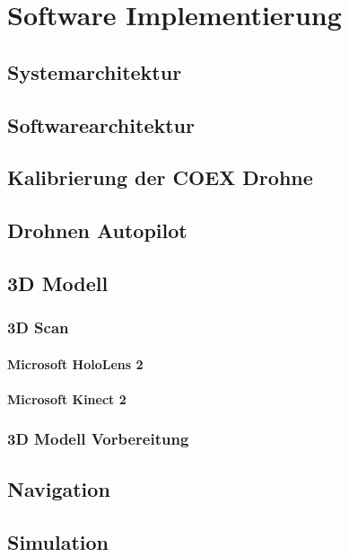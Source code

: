 \chapter{Software Implementierung}

\section{Systemarchitektur}

\section{Softwarearchitektur}

\section{Kalibrierung der COEX Drohne}

\section{Drohnen Autopilot}

\section{3D Modell}

    \subsection{3D Scan}

        \subsubsection{Microsoft HoloLens 2}

        \subsubsection{Microsoft Kinect 2}

    \subsection{3D Modell Vorbereitung}

\section{Navigation}

\section{Simulation}

